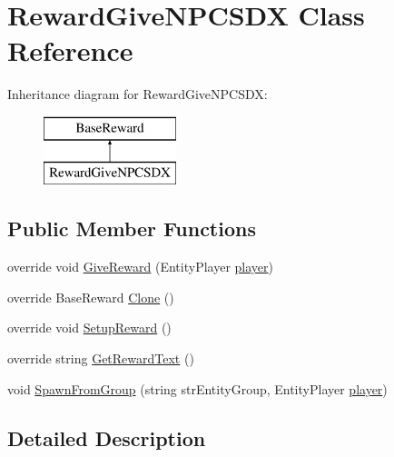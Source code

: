 \hypertarget{class_reward_give_n_p_c_s_d_x}{}\section{Reward\+Give\+N\+P\+C\+S\+DX Class Reference}
\label{class_reward_give_n_p_c_s_d_x}
Inheritance diagram for Reward\+Give\+N\+P\+C\+S\+DX\+:\begin{figure}[H]
\begin{center}
\leavevmode
\includegraphics[height=2.000000cm]{class_reward_give_n_p_c_s_d_x}
\end{center}
\end{figure}
\subsection*{Public Member Functions}
\begin{DoxyCompactItemize}
\item 
override void \mbox{\hyperlink{class_reward_give_n_p_c_s_d_x_ac25cf8c7da450ff19403ac2be58d40cd}{Give\+Reward}} (Entity\+Player \mbox{\hyperlink{_sphere_i_i_01_music_01_boxes_2_config_2_localization_8txt_a4e2cb8aeff651600ea1cc57fe5a929a4}{player}})
\item 
override Base\+Reward \mbox{\hyperlink{class_reward_give_n_p_c_s_d_x_a6f05c8061604c9402ffe4687b3647e29}{Clone}} ()
\item 
override void \mbox{\hyperlink{class_reward_give_n_p_c_s_d_x_a35c70f880e1e1e3e388cb1d910490cf2}{Setup\+Reward}} ()
\item 
override string \mbox{\hyperlink{class_reward_give_n_p_c_s_d_x_a63788494596222b338f91a4c4e643ef7}{Get\+Reward\+Text}} ()
\item 
void \mbox{\hyperlink{class_reward_give_n_p_c_s_d_x_aa22d3c6f10499f3f740897ec11f62237}{Spawn\+From\+Group}} (string str\+Entity\+Group, Entity\+Player \mbox{\hyperlink{_sphere_i_i_01_music_01_boxes_2_config_2_localization_8txt_a4e2cb8aeff651600ea1cc57fe5a929a4}{player}})
\end{DoxyCompactItemize}


\subsection{Detailed Description}


